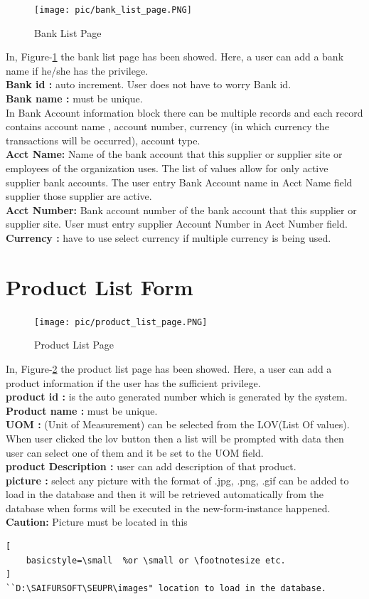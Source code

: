 \documentclass[12pt]{report} %
\begin{document}
\begin{figure}[h]
	\texttt{[image: pic/bank\_list\_page.PNG]}
	\caption{Bank List Page}
	\label{fig:bank_list_page}
\end{figure}
In, Figure-\ref{fig:bank_list_page} the bank list page has been showed. Here, a user can add a bank name if he/she has the privilege.\\
\textbf{Bank id :} auto increment. User does not have to worry  Bank id.\\ 
\textbf{Bank name :} must be unique. \\
In Bank Account information block there can be multiple records and each record contains account name , account number, currency (in which currency the transactions will be occurred), account type. \\
\textbf{Acct Name:} Name of the bank account that this supplier or supplier site or employees of the organization uses. The list of values allow for only active supplier bank accounts. The user entry Bank Account name in Acct Name field supplier those supplier are active. \\
\textbf{Acct Number:} Bank account number of the bank account that this supplier or supplier site. User must entry supplier Account Number in Acct Number field.\\
\textbf{Currency :} have to use select currency if multiple currency is being used.




\section{Product List Form}
\begin{figure}[h]
	\texttt{[image: pic/product\_list\_page.PNG]}
	\caption{Product List Page}
	\label{fig:product_list_page}
\end{figure}
In, Figure-\ref{fig:product_list_page} the product list page has been showed. Here, a user can add a product information if the user has the sufficient privilege.\\ 
\textbf{product id :} is the auto generated number which is generated by the system.\\
\textbf{Product name : } must be unique. \\
\textbf{UOM :} (Unit of Measurement) can be selected from the LOV(List Of values). When user clicked the lov button then a list will be prompted with data then user can select one of them and it be set to the UOM field. \\
\textbf{product Description : } user can add description of that product.\\
 \textbf{picture :} select any picture with the format of .jpg, .png, .gif can be added to load in the database and then it will be retrieved automatically from the database when forms will be executed in the new-form-instance happened. \textbf{Caution: } Picture must be located in this 
 \ifx
 \begin{lstlisting}[
    basicstyle=\small  %or \small or \footnotesize etc.
]
``D:\SAIFURSOFT\SEUPR\images" location to load in the database.
\end{lstlisting} 
\fi
\end{document}
